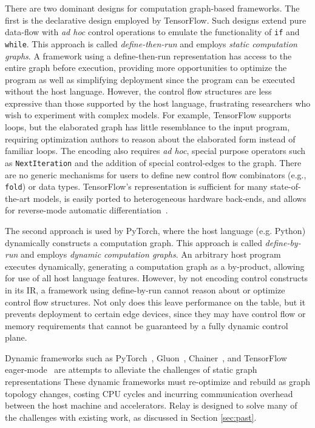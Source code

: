 There are two dominant designs for computation graph-based frameworks.
The first is the declarative design employed by TensorFlow.
Such designs extend pure data-flow with \textit{ad hoc} control operations
  to emulate the functionality of \verb|if| and \verb|while|.
This approach is called \textit{define-then-run} and employs \textit{static
computation graphs}.
A framework using a define-then-run representation has access to the entire
  graph before execution, providing more opportunities to optimize the program
  as well as simplifying deployment since the program can be executed
  without the host language.
However, the control flow structures are less expressive than those supported
  by the host language, frustrating researchers who wish to experiment with complex models.
For example, TensorFlow supports loops,
  but the elaborated graph has little resemblance to the input program, requiring optimization
  authors to reason about the elaborated form instead of familiar loops.
The encoding also requires \textit{ad hoc}, special purpose operators such
  as \verb|NextIteration| and the addition of special control-edges to the graph.
There are no generic mechanisms for users to define new control flow
  combinators (e.g., \verb|fold|) or data types.
TensorFlow's representation is sufficient for many state-of-the-art models,
  is easily ported to heterogeneous hardware back-ends,
  and allows for reverse-mode automatic differentiation~{\citep{ad_survey, tensorflow}}.

The second approach is used by PyTorch, where the host language (e.g. Python) dynamically
  constructs a computation graph.
This approach is called \textit{define-by-run} and employs \textit{dynamic computation graphs}.
An arbitrary host program executes dynamically, generating a computation graph as a by-product,
  allowing for use of all host language features.
However, by not encoding control constructs in its IR, a framework
  using define-by-run cannot reason about or optimize control flow structures.
Not only does this leave performance on the table, but it prevents deployment to certain
  edge devices, since they may have control flow or memory requirements that cannot be
  guaranteed by a fully dynamic control plane.

Dynamic frameworks such as  PyTorch~\citep{pytorch_ad},
    Gluon~\citep{gluon},
    Chainer~\citep{chainer_learningsys2015},
    and TensorFlow eager-mode~\citep{tf_eager} are attempts to alleviate the
    challenges of static graph representations
These dynamic frameworks must re-optimize and rebuild as graph topology changes, costing
    CPU cycles and incurring communication overhead between the host machine and accelerators.
Relay is designed to solve many of the challenges with existing work, as
  discussed in Section \ref{sec:past}.

